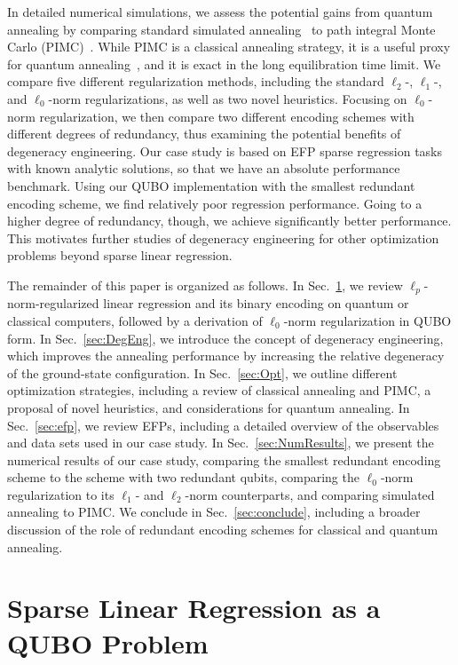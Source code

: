 \documentclass[aps,prd,twocolumn, superscriptaddress,preprintnumbers, nofootinbib,longbibliography,floatfix]{revtex4-2}
\DeclareRobustCommand{\Sec}[1]{Sec.~\ref{#1}}
\begin{document}
In detailed numerical simulations, we assess the potential gains from quantum annealing by comparing standard simulated annealing~\cite{doi:10.1063/1.1632130} to path integral Monte Carlo (PIMC)~\cite{Barker1979}.
%
While PIMC is a classical annealing strategy, it is a useful proxy for quantum annealing~\cite{PhysRevLett.117.180402}, and it is exact in the long equilibration time limit.
%
We compare five different regularization methods, including the standard $\ell_2$-, $\ell_1$-, and $\ell_0$-norm regularizations, as well as two novel heuristics.
%
Focusing on $\ell_0$-norm regularization, we then compare two different encoding schemes with different degrees of redundancy, thus examining the potential benefits of degeneracy engineering.
%
Our case study is based on EFP sparse regression tasks with known analytic solutions, so that we have an absolute performance benchmark.
%
Using our QUBO implementation with the smallest redundant encoding scheme, we find relatively poor regression performance.
%
Going to a higher degree of redundancy, though, we achieve significantly better performance.
%
This motivates further studies of degeneracy engineering for other optimization problems beyond sparse linear regression. 


The remainder of this paper is organized as follows.
%
In \Sec{sec:qubo}, we review $\ell_p$-norm-regularized linear regression and its binary encoding on quantum or classical computers, followed by a derivation of $\ell_0$-norm regularization in QUBO form.
%
In \Sec{sec:DegEng}, we introduce the concept of degeneracy engineering, which improves the annealing performance by increasing the relative degeneracy of the ground-state configuration.
%
In \Sec{sec:Opt}, we outline different optimization strategies, including a review of classical annealing and PIMC, a proposal of novel heuristics, and considerations for quantum annealing.
%
In \Sec{sec:efp}, we review EFPs, including a detailed overview of the observables and data sets used in our case study.
%
In \Sec{sec:NumResults}, we present the numerical results of our case study, comparing the smallest redundant encoding scheme to the scheme with two redundant qubits, comparing the $\ell_0$-norm regularization to its $\ell_1$- and $\ell_2$-norm counterparts, and comparing simulated annealing to PIMC\@.
%
We conclude in \Sec{sec:conclude}, including a broader discussion of the role of redundant encoding schemes for classical and quantum annealing.


\section{Sparse Linear Regression as a QUBO Problem}\label{sec:qubo}
\end{document}
